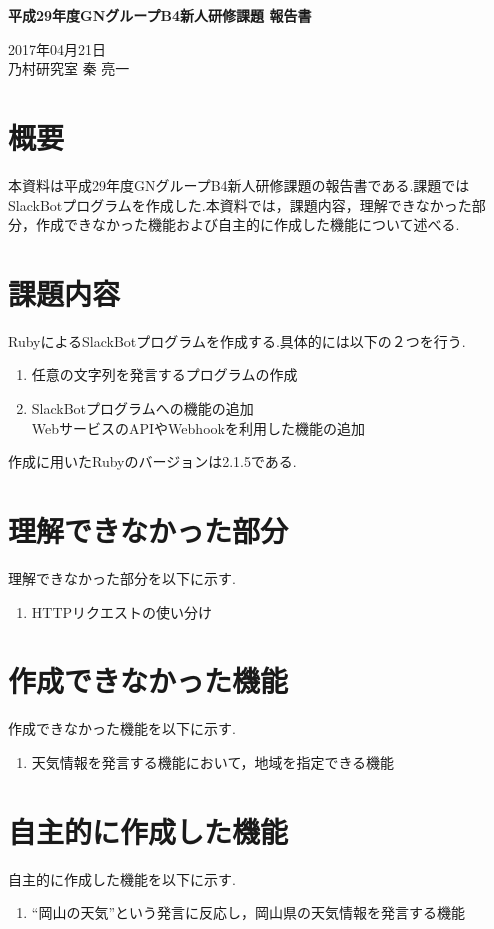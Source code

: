 \documentclass[fleqn, 14pt]{sty/extarticlej}
\begin{document}
\begin{center}
{\Large {\bf 平成29年度GNグループB4新人研修課題 報告書}}

\end{center}
\begin{flushright}
2017年04月21日\\

乃村研究室 秦 亮一
\end{flushright}
\section{概要}
本資料は平成29年度GNグループB4新人研修課題の報告書である.課題ではSlackBotプログラムを作成した.本資料では，課題内容，理解できなかった部分，作成できなかった機能および自主的に作成した機能について述べる.

\section{課題内容}
RubyによるSlackBotプログラムを作成する.具体的には以下の２つを行う.
\begin{enumerate}
\item 任意の文字列を発言するプログラムの作成
\item SlackBotプログラムへの機能の追加\\
  WebサービスのAPIやWebhookを利用した機能の追加
\end{enumerate}
\hspace{30pt}作成に用いたRubyのバージョンは2.1.5である.



\section{理解できなかった部分}
理解できなかった部分を以下に示す.
\begin{enumerate}
\item HTTPリクエストの使い分け

\end{enumerate}

\section{作成できなかった機能}
作成できなかった機能を以下に示す.
\begin{enumerate}
\item 天気情報を発言する機能において，地域を指定できる機能

\end{enumerate}

\section{自主的に作成した機能}
自主的に作成した機能を以下に示す.
\begin{enumerate}
\item ``岡山の天気''という発言に反応し，岡山県の天気情報を発言する機能

\end{enumerate}
\end{document}
